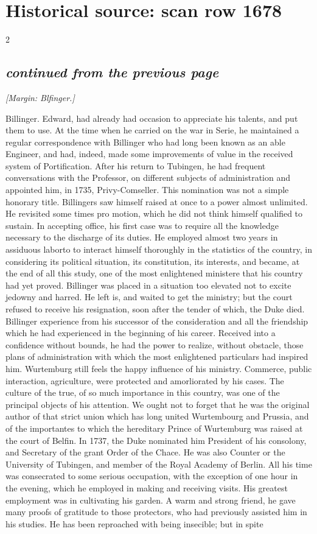 \documentclass[10pt]{article}
\begin{document}
\section*{Historical source: scan row 1678}
\begin{multicols}{2}
\subsection*{\textit{continued from the previous page}}
{\small\itshape [Margin: Blfinger.]}\par
Billinger. Edward, had already had occasion to appreciate his talents, and put them to use. At the time when he carried on the war in Serie, he maintained a regular correspondence with Billinger who had long been known as an able Engineer, and had, indeed, made some improvements of value in the received system of Portification. After his return to Tubingen, he had frequent conversations with the Professor, on different subjects of administration and appointed him, in 1735, Privy-Comseller. This nomination was not a simple honorary title. Billingers saw himself raised at once to a power almost unlimited. He revisited some times pro motion, which he did not think himself qualified to sustain. In accepting office, his first case was to require all the knowledge necessary to the discharge of its duties. He employed almost two years in assiduous laborto to interact himself thoroughly in the statistics of the country, in considering its political situation, its constitution, its interests, and became, at the end of all this study, one of the most enlightened ministere that his country had yet proved. Billinger was placed in a situation too elevated not to excite jedowny and harred. He left is, and waited to get the ministry; but the court refused to receive his resignation, soon after the tender of which, the Duke died. Billinger experience from his successor of the consideration and all the friendship which he had experienced in the beginning of his career. Received into a confidence without bounds, he had the power to realize, without obstacle, those plans of administration with which the most enlightened particulars had inspired him. Wurtemburg still feels the happy influence of his ministry. Commerce, public interaction, agriculture, were protected and amorliorated by his cases. The culture of the true, of so much importance in this country, was one of the principal objects of his attention. We ought not to forget that he was the original author of that strict union which has long united Wurtembourg and Prussia, and of the importantes to which the hereditary Prince of Wurtemburg was raised at the court of Belfin. In 1737, the Duke nominated him President of his consolony, and Secretary of the grant Order of the Chace. He was also Counter or the University of Tubingen, and member of the Royal Academy of Berlin. All his time was consecrated to some serious occupation, with the exception of one hour in the evening, which he employed in making and receiving visits. His greatest employment was in cultivating his garden. A warm and strong friend, he gave many proofs of gratitude to those protectors, who had previously assisted him in his studies. He has been reproached with being insecible; but in spite 
\end{multicols}
\end{document}
